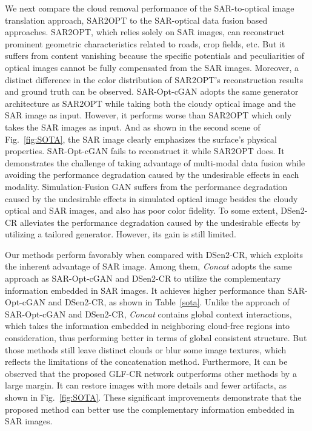 \documentclass[a4paper,fleqn]{cas-dc}
\begin{document}
We next compare the cloud removal performance of the SAR-to-optical image translation approach, SAR2OPT to the SAR-optical data fusion based approaches. SAR2OPT, which relies solely on SAR images, can reconstruct prominent geometric characteristics related to roads, crop fields, etc. But it suffers from content vanishing because the specific potentials and peculiarities of optical images cannot be fully compensated from the SAR images. Moreover, a distinct difference in the color distribution of SAR2OPT's reconstruction results and ground truth can be observed. SAR-Opt-cGAN adopts the same generator architecture as SAR2OPT while taking both the cloudy optical image and the SAR image as input. 
However, it performs worse than SAR2OPT which only takes the SAR images as input. 
And as shown in the second scene of Fig.~\ref{fig:SOTA}, the SAR image clearly emphasizes the surface's physical properties. SAR-Opt-cGAN fails to reconstruct it while SAR2OPT does. It demonstrates the challenge of taking advantage of multi-modal data fusion while avoiding the performance degradation caused by the undesirable effects in each modality.
Simulation-Fusion GAN suffers from the performance degradation caused by the undesirable effects in simulated optical image besides the cloudy optical and SAR images, and also has poor color fidelity. 
To some extent, DSen2-CR alleviates the performance degradation caused by the undesirable effects by utilizing a tailored generator. However, its gain is still limited.

Our methods perform favorably when compared with DSen2-CR, which exploits the inherent advantage of SAR image. Among them, {\it Concat} adopts the same approach as SAR-Opt-cGAN and DSen2-CR to utilize the complementary information embedded in SAR images. It achieves higher performance than SAR-Opt-cGAN and DSen2-CR, as shown in Table~\ref{sota}. Unlike the approach of SAR-Opt-cGAN and DSen2-CR, {\it Concat} contains global context interactions, which takes the information embedded in neighboring cloud-free regions into consideration, thus performing better in terms of global consistent structure. But those methods still leave distinct clouds or blur some image textures, which reflects the limitations of the concatenation method. Furthermore, It can be observed that the proposed GLF-CR network outperforms other methods by a large margin. It can restore images with more details and fewer artifacts, as shown in Fig.~\ref{fig:SOTA}. These significant improvements demonstrate that the proposed method can better use the complementary information embedded in SAR images.
\end{document}
